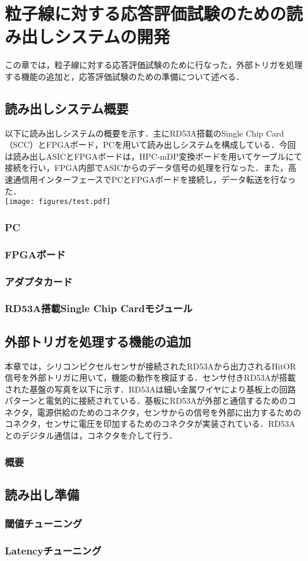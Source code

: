 \chapter{粒子線に対する応答評価試験のための読み出しシステムの開発}
この章では，粒子線に対する応答評価試験のために行なった，外部トリガを処理する機能の追加と，応答評価試験のための準備について述べる．

\section{読み出しシステム概要}
以下に読み出しシステムの概要を示す．主にRD53A搭載のSingle Chip Card（SCC）とFPGAボード，PCを用いて読み出しシステムを構成している．今回は読み出しASICとFPGAボードは，HPC-mDP変換ボードを用いてケーブルにて接続を行い，FPGA内部でASICからのデータ信号の処理を行なった．また，高速通信用インターフェースでPCとFPGAボードを接続し，データ転送を行なった．\\

\texttt{[image: figures/test.pdf]}


\subsection{PC}
\subsection{FPGAボード}
\subsection{アダプタカード}
\subsection{RD53A搭載Single Chip Cardモジュール}

\section{外部トリガを処理する機能の追加}
本章では，シリコンピクセルセンサが接続されたRD53Aから出力されるHitOR信号を外部トリガに用いて，機能の動作を検証する．センサ付きRD53Aが搭載された基盤の写真を以下に示す．RD53Aは細い金属ワイヤにより基板上の回路パターンと電気的に接続されている．基板にRD53Aが外部と通信するためのコネクタ，電源供給のためのコネクタ，センサからの信号を外部に出力するためのコネクタ，センサに電圧を印加するためのコネクタが実装されている．RD53Aとのデジタル通信は，コネクタを介して行う．

\subsection{概要}


\section{読み出し準備}
\subsection{閾値チューニング}
\subsection{Latencyチューニング}


